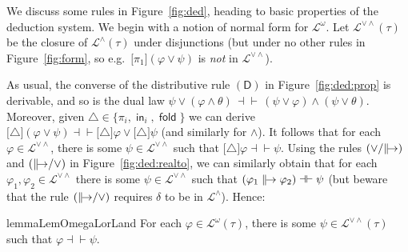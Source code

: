 \documentclass[%
  a4paper,
  UKenglish,
  cleveref,
  autoref,
  thm-restate,
  numberwithinsect,
]{lipics-v2021}
\newcommand\defthesisiff{\dashv\vdash}
\newcommand\thesisiff{\mathrel{\defthesisiff}}
\newcommand\ax[1]{(\mathsf{#1})}
\newcommand\term[1]{\mathsf{#1}}
\newcommand\inj{\mathop{\term{in}}}
\newcommand\fold{\mathop{\term{fold}}}
\newcommand\defrealto{\mathrel\parallel\joinrel\to}
\newcommand\realto{\mathrel{\defrealto}}
\newcommand\PT{\tau}		%
\newcommand\Lang{\mathcal{L}}
\newcommand\form[1]{\lbrack #1 \rbrack}
\newcommand\modgen{\mathord{\triangle}}	%
\begin{document}
We discuss some rules in Figure~\ref{fig:ded},
heading to basic properties of the deduction system.
We begin with a notion of normal form for $\Lang^\omega$.
Let $\Lang^{\lor\land}(\PT)$ be the closure of
$\Lang^\land(\PT)$ under disjunctions
(but under no other rules in Figure~\ref{fig:form},
so e.g.\ $\form{\pi_1}(\varphi \lor \psi)$ is \emph{not} in
$\Lang^{\lor\land}$).

As usual,
the converse of the distributive rule $\ax{D}$
in Figure~\ref{fig:ded:prop} is derivable,
and so is the dual law
\(
  \psi \lor (\varphi \land \theta)
  \,\thesisiff\,
  (\psi \lor \varphi) \land (\psi \lor \theta)
\).
Moreover, given $\modgen \in \{\pi_i,\inj_i,\fold\}$
we can derive
\(
  \form{\modgen}(\varphi \lor \psi)
  \thesisiff
  \form{\modgen}\varphi \lor \form{\modgen}\psi
\)
(and similarly for $\land$).
It follows that for each $\varphi \in \Lang^{\lor\land}$,
there is some $\psi \in \Lang^{\lor\land}$
such that $\form{\modgen}\varphi \thesisiff \psi$.
Using the rules $\ax{\lor/{\realto}}$
and $\ax{{\realto}/\lor}$ in Figure~\ref{fig:ded:realto},
we can similarly obtain that for each
$\varphi_1, \varphi_2 \in \Lang^{\lor\land}$
there is some $\psi \in \Lang^{\lor\land}$
such that
$(\varphi_1 \realto \varphi_2) \thesisiff \psi$
(but beware that the rule $\ax{{\realto}/\lor}$ requires
$\delta$ to be in $\Lang^\land$).
Hence:



\begin{restatable}{lemma}{LemOmegaLorLand}
\label{lem:ded:omegalorland}
For each $\varphi \in \Lang^\omega(\PT)$,
there is some $\psi \in \Lang^{\lor\land}(\PT)$
such that $\varphi \thesisiff \psi$.
\end{restatable}
\end{document}
